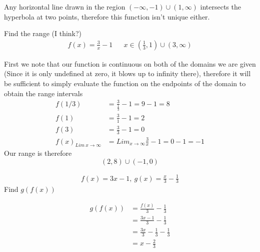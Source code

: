 \documentclass[a4paper]{article}
\begin{document}
Any horizontal line drawn in the region \((-\infty, -1) \cup (1, \infty)\) intersects the hyperbola at two points, therefore this function isn't unique either.


\begin{question}{}{}
Find the range (I think?)
\begin{align*}
f(x) = \frac{3}{x} -1 && x \in (\frac{1}{3}, 1) \cup (3, \infty)
\end{align*}
\end{question}
First we note that our function is continuous on both of the domains we are given (Since it is only undefined at zero, it blows up to infinity there), therefore it will be sufficient to simply evaluate the function on the endpoints of the domain to obtain the range intervals
\begin{align*}
f(1/3) &=\frac{3}{\frac{1}{3}} - 1 = 9-1 = 8 \\
f(1) &= \frac{3}{1} -1 = 2 \\
f(3) &= \frac{3}{3} -1 = 0 \\
f(x)_{Lim\ x \to \infty} &= Lim_{x\to \infty} \frac{3}{x} - 1 = 0 - 1 = -1
\end{align*}
Our range is therefore
\[
(2, 8) \cup (-1, 0)
\]

\begin{question}{}{}
\begin{align*}
f(x) = 3x-1, \ g(x) =\frac{x}{3} - \frac{1}{3}
\end{align*}
Find \(g(f(x))\)
\end{question}
\begin{align*}
g(f(x)) &= \frac{f(x)}{3} - \frac{1}{3} \\
    &= \frac{3x - 1}{3} - \frac{1}{3} \\
    &= \frac{3x}{3} - \frac{1}{3} -\frac{1}{3} \\
    &= x -\frac{2}{3}
\end{align*}
\end{document}
